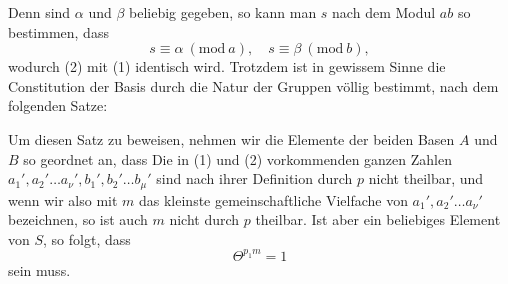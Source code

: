 Denn sind $\alpha$ und $\beta$ beliebig gegeben, so kann man $s$ nach dem Modul $ab$ so bestimmen, dass
\[
s \equiv \alpha \ (\mathrm{mod}\ a), \quad s \equiv \beta \ (\mathrm{mod}\ b),
\]
wodurch (2) mit (1) identisch wird. Trotzdem ist in gewissem Sinne die Constitution der Basis durch die Natur der Gruppen völlig bestimmt, nach dem folgenden Satze:


Um diesen Satz zu beweisen, nehmen wir die Elemente der beiden Basen $A$ und $B$ so geordnet an, dass
Die in (1) und (2) vorkommenden ganzen Zahlen $a_1', a_2' \ldots a_\nu', b_1', b_2' \ldots b_\mu'$ sind nach ihrer Definition durch $p$ nicht theilbar, und wenn wir also mit $m$ das kleinste gemeinschaftliche Vielfache von $a_1', a_2' \ldots a_\nu'$ bezeichnen, so ist auch $m$ nicht durch $p$ theilbar. Ist aber
ein beliebiges Element von $S$, so folgt, dass
\[
\Theta^{p_1 m} = 1
\]
sein muss.
